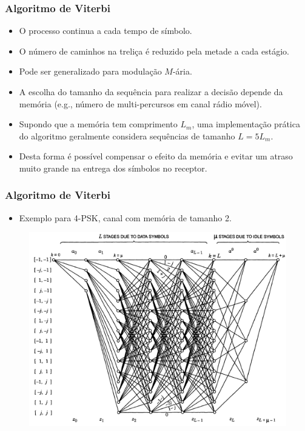 \begin{frame}
	\frametitle{Algoritmo de Viterbi}

	\begin{itemize}
	    \item O processo continua a cada tempo de símbolo.
	    \item O número de caminhos na treliça é reduzido pela metade a cada estágio.
	    \item Pode ser generalizado para modulação $M$-ária.
	    \item A escolha do tamanho da sequência para realizar a decisão depende da memória (e.g., número de multi-percursos em canal rádio móvel).
	    \item Supondo que a memória tem comprimento $L_m$, uma implementação prática do algoritmo geralmente considera sequências de tamanho $L=5L_m$.
	    \item Desta forma é possível compensar o efeito da memória e evitar um atraso muito grande na entrega dos símbolos no receptor.
	\end{itemize}
\end{frame}

\begin{frame}
	\frametitle{Algoritmo de Viterbi}

	\begin{itemize}
	    \item Exemplo para 4-PSK, canal com memória de tamanho 2.
	\end{itemize}
	\begin{figure}[t]	
	  \begin{center}
	    \includegraphics[width=0.76\columnwidth]{figs/pam_39}
	  \end{center}
	\end{figure}
\end{frame}


